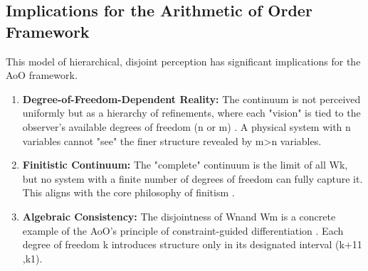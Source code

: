 \documentclass[12pt,a4paper]{article}
\theoremstyle{definition}
\theoremstyle{remark}
\begin{document}
\subsection{Implications for the Arithmetic of Order Framework}
This model of hierarchical, disjoint perception has significant implications for the AoO framework.
\begin{enumerate}
\item \textbf{Degree-of-Freedom-Dependent Reality:} The continuum is not perceived uniformly but as a hierarchy of refinements, where each "vision" is tied to the observer’s available degrees of freedom (n or m) \cite{ElKhettabi2025AoO}. A physical system with n variables cannot "see" the finer structure revealed by m>n variables.
\item \textbf{Finitistic Continuum:} The "complete" continuum is the limit of all Wk​, but no system with a finite number of degrees of freedom can fully capture it. This aligns with the core philosophy of finitism \cite{ElKhettabi2025AoO, SEP_Finitism}.
\item \textbf{Algebraic Consistency:} The disjointness of Wn​ and Wm​ is a concrete example of the AoO’s principle of constraint-guided differentiation \cite{ElKhettabi2025AoO}. Each degree of freedom k introduces structure only in its designated interval (k+11​,k1​).
\end{enumerate}
\end{document}
